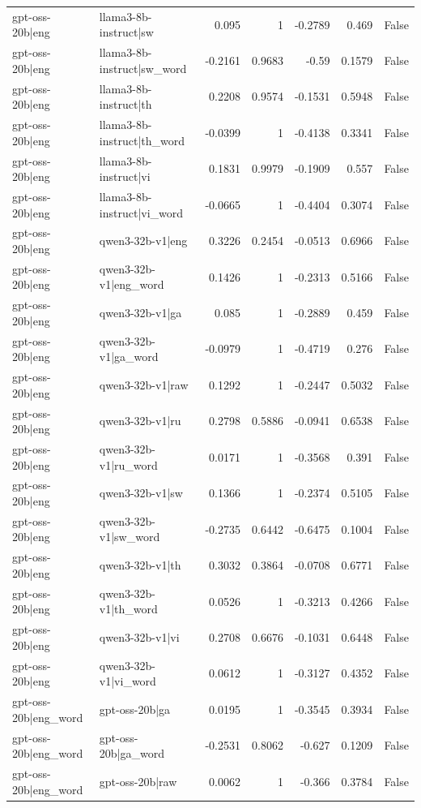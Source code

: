 \begin{table}
\begin{tabular}{l l r r r r l}
gpt-oss-20b|eng & llama3-8b-instruct|sw & 0.095 & 1 & -0.2789 & 0.469 & False \\
gpt-oss-20b|eng & llama3-8b-instruct|sw_word & -0.2161 & 0.9683 & -0.59 & 0.1579 & False \\
gpt-oss-20b|eng & llama3-8b-instruct|th & 0.2208 & 0.9574 & -0.1531 & 0.5948 & False \\
gpt-oss-20b|eng & llama3-8b-instruct|th_word & -0.0399 & 1 & -0.4138 & 0.3341 & False \\
gpt-oss-20b|eng & llama3-8b-instruct|vi & 0.1831 & 0.9979 & -0.1909 & 0.557 & False \\
gpt-oss-20b|eng & llama3-8b-instruct|vi_word & -0.0665 & 1 & -0.4404 & 0.3074 & False \\
gpt-oss-20b|eng & qwen3-32b-v1|eng & 0.3226 & 0.2454 & -0.0513 & 0.6966 & False \\
gpt-oss-20b|eng & qwen3-32b-v1|eng_word & 0.1426 & 1 & -0.2313 & 0.5166 & False \\
gpt-oss-20b|eng & qwen3-32b-v1|ga & 0.085 & 1 & -0.2889 & 0.459 & False \\
gpt-oss-20b|eng & qwen3-32b-v1|ga_word & -0.0979 & 1 & -0.4719 & 0.276 & False \\
gpt-oss-20b|eng & qwen3-32b-v1|raw & 0.1292 & 1 & -0.2447 & 0.5032 & False \\
gpt-oss-20b|eng & qwen3-32b-v1|ru & 0.2798 & 0.5886 & -0.0941 & 0.6538 & False \\
gpt-oss-20b|eng & qwen3-32b-v1|ru_word & 0.0171 & 1 & -0.3568 & 0.391 & False \\
gpt-oss-20b|eng & qwen3-32b-v1|sw & 0.1366 & 1 & -0.2374 & 0.5105 & False \\
gpt-oss-20b|eng & qwen3-32b-v1|sw_word & -0.2735 & 0.6442 & -0.6475 & 0.1004 & False \\
gpt-oss-20b|eng & qwen3-32b-v1|th & 0.3032 & 0.3864 & -0.0708 & 0.6771 & False \\
gpt-oss-20b|eng & qwen3-32b-v1|th_word & 0.0526 & 1 & -0.3213 & 0.4266 & False \\
gpt-oss-20b|eng & qwen3-32b-v1|vi & 0.2708 & 0.6676 & -0.1031 & 0.6448 & False \\
gpt-oss-20b|eng & qwen3-32b-v1|vi_word & 0.0612 & 1 & -0.3127 & 0.4352 & False \\
gpt-oss-20b|eng_word & gpt-oss-20b|ga & 0.0195 & 1 & -0.3545 & 0.3934 & False \\
gpt-oss-20b|eng_word & gpt-oss-20b|ga_word & -0.2531 & 0.8062 & -0.627 & 0.1209 & False \\
gpt-oss-20b|eng_word & gpt-oss-20b|raw & 0.0062 & 1 & -0.366 & 0.3784 & False \\

\end{tabular}
\end{table}
